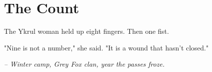 \chapter*{The Count}

The Ykrul woman held up eight fingers. Then one fist.

"Nine is not a number," she said. "It is a wound that hasn't closed."

\smallskip

\noindent \textit{-- Winter camp, Grey Fox clan, year the passes froze.}

